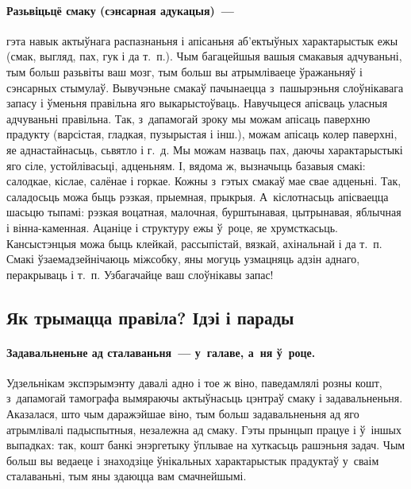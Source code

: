 \paragraph{Разьвіцьцё смаку (сэнсарная адукацыя)~---} гэта навык актыўнага распазнаньня і апісаньня аб'ектыўных характарыстык ежы (смак, выгляд, пах, гук і да т.~п.).
Чым багацейшыя вашыя смакавыя адчуваньні, тым больш разьвіты ваш мозг, тым больш вы атрымліваеце ўражаньняў і сэнсарных стымулаў. Вывучэньне смакаў пачынаецца з~пашырэньня слоўнікавага запасу і ўменьня правільна яго выкарыстоўваць. Навучыцеся апісваць уласныя адчуваньні правільна. Так, з~дапамогай зроку мы можам апісаць паверхню прадукту (варсістая, гладкая, пузырыстая і інш.), можам апісаць колер паверхні, яе аднастайнасьць, сьвятло і г.~д. Мы можам назваць пах, даючы характарыстыкі яго сіле, устойлівасьці, адценьням. І, вядома ж, вызначыць базавыя смакі: салодкае, кіслае, салёнае і горкае. Кожны з~гэтых смакаў мае свае адценьні. Так, саладосьць можа быць рэзкая, прыемная, прыкрыя. А~кіслотнасьць апісваецца шасьцю тыпамі: рэзкая воцатная, малочная, бурштынавая, цытрынавая, яблычная і вінна-каменная. Ацаніце і структуру ежы ў~роце, яе хрумсткасьць. Кансыстэнцыя можа быць клейкай, рассыпістай, вязкай, ахінальнай і да т.~п. Смакі ўзаемадзейнічаюць міжсобку, яны могуць узмацняць адзін аднаго, перакрываць і т.~п. Узбагачайце ваш слоўнікавы запас!


\subsection{Як трымацца правіла? Ідэі і парады}

\paragraph{Задавальненьне ад сталаваньня~--- у~галаве, а~ня ў~роце.}
Удзельнікам экспэрымэнту давалі адно і тое ж віно, паведамлялі розны кошт, з~дапамогай тамографа вымяраючы актыўнасьць цэнтраў смаку і задавальненьня. Аказалася, што чым даражэйшае віно, тым больш задавальненьня ад яго атрымлівалі падыспытныя, незалежна ад смаку. Гэты прынцып працуе і ў~іншых выпадках: так, кошт банкі энэргетыку ўплывае на хуткасьць рашэньня задач. Чым больш вы ведаеце і знаходзіце ўнікальных характарыстык прадуктаў у~сваім сталаваньні, тым яны здаюцца вам смачнейшымі.


